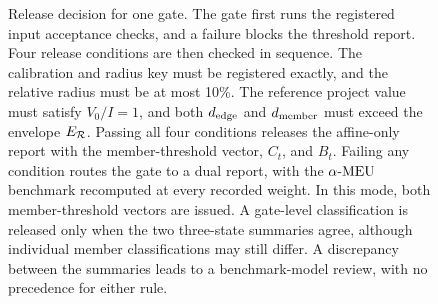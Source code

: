 \begin{figure}[!t]
{\begin{tikzpicture}
\end{tikzpicture}}
\caption{Release decision for one gate. The gate first runs the registered input acceptance checks, and a failure blocks the threshold report. Four release conditions are then checked in sequence. The calibration and radius key must be registered exactly, and the relative radius must be at most 10\%. The reference project value must satisfy $V_0/I=1$, and both $d_{\mathrm{edge}}$ and $d_{\mathrm{member}}$ must exceed the envelope $E_{\mathcal{R}}$. Passing all four conditions releases the affine-only report with the member-threshold vector, $C_t$, and $B_t$. Failing any condition routes the gate to a dual report, with the $\alpha\text{-MEU}$ benchmark recomputed at every recorded weight. In this mode, both member-threshold vectors are issued. A gate-level classification is released only when the two three-state summaries agree, although individual member classifications may still differ. A discrepancy between the summaries leads to a benchmark-model review, with no precedence for either rule.}
\label{fig:release}
\end{figure}
